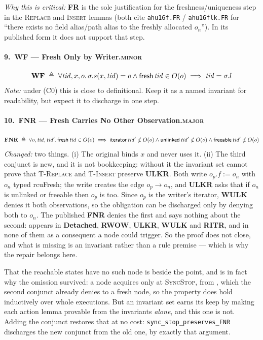 \emph{Why this is critical:} \textbf{FR} is the sole justification for the
freshness/uniqueness step in the \textsc{Replace} and \textsc{Insert} lemmas
(both cite \texttt{ahu16f.FR} / \texttt{ahu16flk.FR} for ``there exists no field
alias/path alias to the freshly allocated $o_n$'').  In its published form it
does not support that step.

\paragraph{9.\ WF --- Fresh Only by Writer.\hfill\textsc{minor}}
\[
\textbf{WF} \;\triangleq\; \forall \mathit{tid},x,o \ldotp
  \sigma.s(x,\mathit{tid}) = o \land \textsf{fresh}\,\mathit{tid} \in O(o) \implies \mathit{tid} = \sigma.l
\]
\emph{Note:} under (C0) this is close to definitional.  Keep it as a named
invariant for readability, but expect it to discharge in one step.

\paragraph{10.\ FNR --- Fresh Carries No Other Observation.\hfill\textsc{major}}
\[
\textbf{FNR} \;\triangleq\; \forall o,\mathit{tid},\mathit{tid}' \ldotp
  \textsf{fresh}\,\mathit{tid} \in O(o) \implies
  \textsf{iterator}\,\mathit{tid}' \notin O(o) \land \textsf{unlinked}\,\mathit{tid}' \notin O(o)
  \land \textsf{freeable}\,\mathit{tid}' \notin O(o)
\]
\emph{Changed:} two things.  (i) The original binds $x$ and never uses it.
(ii) The third conjunct is new, and it is not bookkeeping: without it the
invariant set cannot prove that \textsc{T-Replace} and \textsc{T-Insert}
preserve \textbf{ULKR}.  Both write $o_p.f := o_n$ with $o_n$ typed
\textsf{rcuFresh}; the write creates the edge $o_p \to o_n$, and \textbf{ULKR}
asks that if $o_n$ is unlinked or freeable then $o_p$ is too.  Since $o_p$ is
the writer's iterator, \textbf{WULK} denies it both observations, so the
obligation can be discharged only by denying both to $o_n$.  The published
\textbf{FNR} denies the first and says nothing about the second: \frbl{}
appears in \textbf{Detached}, \textbf{RWOW}, \textbf{ULKR}, \textbf{WULK} and
\textbf{RITR}, and in none of them as a consequent a \frsh{} node could
trigger.  So the proof does not close, and what is missing is an invariant
rather than a rule premise --- which is why the repair belongs here.

That the reachable states have no such node is beside the point, and is in fact
why the omission survived: a node acquires \frbl{} only at \textsc{SyncStop},
from \unlk{}, which the second conjunct already denies to a fresh node, so the
property does hold inductively over whole executions.  But an invariant set
earns its keep by making each action lemma provable from the invariants
\emph{alone}, and this one is not.  Adding the conjunct restores that at no
cost: \texttt{sync\_stop\_preserves\_FNR} discharges the new conjunct from the
old one, by exactly that argument.

